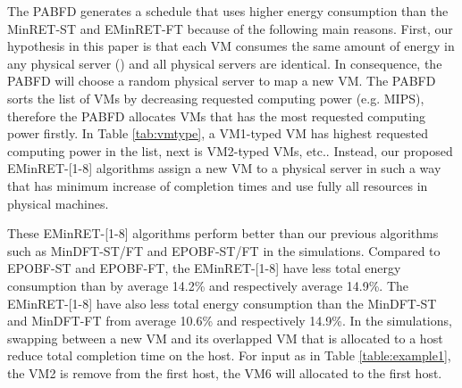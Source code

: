 The PABFD generates a schedule that uses higher energy consumption than
the MinRET-ST and EMinRET-FT because of the following main reasons.
First, our hypothesis in this paper is that each VM consumes the same amount of energy 
in any physical server () and all physical servers
are identical. In consequence, the PABFD will choose a random
physical server to map a new VM. The PABFD sorts the list of VMs by decreasing requested computing power (e.g. MIPS), 
 therefore the PABFD allocates VMs that has the most requested computing power firstly. 
 In Table \ref{tab:vmtype}, a VM1-typed VM has highest requested computing power in the list, next is VM2-typed VMs, etc..
Instead, our proposed EMinRET-[1-8] algorithms assign a new VM to a physical 
server in such a way that has minimum increase of completion times and use fully all resources in physical machines.

These EMinRET-[1-8] algorithms perform
better than our previous algorithms such as MinDFT-ST/FT and EPOBF-ST/FT in the simulations. 
Compared to EPOBF-ST and EPOBF-FT, the EMinRET-[1-8] have less
total energy consumption than by average 14.2\% and respectively average 14.9\%.
The EMinRET-[1-8] have also less
total energy consumption than the MinDFT-ST and MinDFT-FT from average 10.6\% and respectively 14.9\%.
In the simulations, swapping between a new VM and its overlapped VM that is allocated to a host 
 reduce total completion time on the host. 
 For input as in Table \ref{table:example1}, the VM2 is remove from the first host, 
 the VM6 will allocated to the first host.








